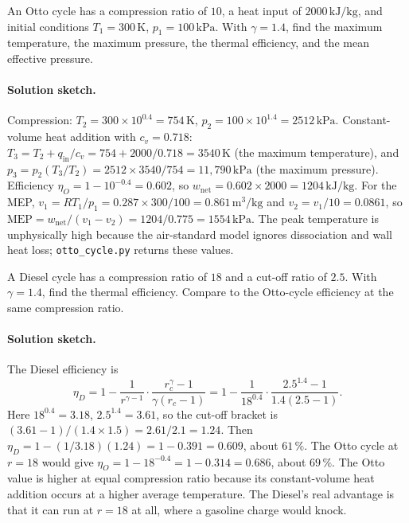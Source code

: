 \begin{exercise}
An Otto cycle has a compression ratio of $10$, a heat input of
$2000\,\text{kJ}/\text{kg}$, and initial conditions $T_1 = 300\,\si{
\kelvin}$, $p_1 = 100\,\text{kPa}$. With $\gamma = 1.4$, find the
maximum temperature, the maximum pressure, the thermal efficiency,
and the mean effective pressure.

\paragraph{Solution sketch.} Compression: $T_2 = 300 \times 10^{0.4} =
754\,\si{\kelvin}$, $p_2 = 100 \times 10^{1.4} = 2512\,\text{kPa}$.
Constant-volume heat addition with $c_v = 0.718$: $T_3 = T_2 +
q_{\text{in}}/c_v = 754 + 2000/0.718 = 3540\,\si{\kelvin}$ (the maximum
temperature), and $p_3 = p_2 (T_3/T_2) = 2512 \times 3540/754 =
11{,}790\,\text{kPa}$ (the maximum pressure). Efficiency $\eta_O = 1 -
10^{-0.4} = 0.602$, so $w_{\text{net}} = 0.602 \times 2000 = 1204\,
\text{kJ}/\text{kg}$. For the MEP, $v_1 = RT_1/p_1 = 0.287 \times
300/100 = 0.861\,\text{m}^3/\text{kg}$ and $v_2 = v_1/10 = 0.0861$, so
$\text{MEP} = w_{\text{net}}/(v_1 - v_2) = 1204/0.775 = 1554\,\text{kPa}$.
The peak temperature is unphysically high because the air-standard model
ignores dissociation and wall heat loss; \texttt{otto\_cycle.py} returns
these values.
\end{exercise}

\begin{exercise}
A Diesel cycle has a compression ratio of $18$ and a cut-off ratio of
$2.5$. With $\gamma = 1.4$, find the thermal efficiency. Compare to
the Otto-cycle efficiency at the same compression ratio.

\paragraph{Solution sketch.} The Diesel efficiency is
\[
\eta_D = 1 - \frac{1}{r^{\gamma-1}}\cdot\frac{r_c^\gamma - 1}{
\gamma(r_c - 1)}
= 1 - \frac{1}{18^{0.4}}\cdot\frac{2.5^{1.4} - 1}{1.4(2.5 - 1)}.
\]
Here $18^{0.4} = 3.18$, $2.5^{1.4} = 3.61$, so the cut-off bracket is
$(3.61 - 1)/(1.4 \times 1.5) = 2.61/2.1 = 1.24$. Then $\eta_D = 1 -
(1/3.18)(1.24) = 1 - 0.391 = 0.609$, about $61\,\%$. The Otto cycle at
$r = 18$ would give $\eta_O = 1 - 18^{-0.4} = 1 - 0.314 = 0.686$, about
$69\,\%$. The Otto value is higher at equal compression ratio because
its constant-volume heat addition occurs at a higher average
temperature. The Diesel's real advantage is that it can run at $r = 18$
at all, where a gasoline charge would knock.
\end{exercise}

